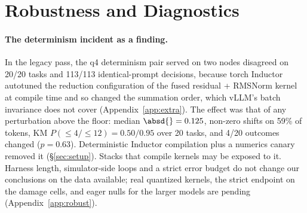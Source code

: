 \section{Robustness and Diagnostics}
\label{sec:diagnostics}

\paragraph{The determinism incident as a finding.} In the legacy pass, the q4 determinism pair served on two nodes disagreed on 20/20 tasks and 113/113 identical-prompt decisions, because torch Inductor autotuned the reduction configuration of the fused residual + RMSNorm kernel at compile time and so changed the summation order, which vLLM's batch invariance does not cover (Appendix~\ref{app:extra}). The effect was that of any perturbation above the floor: median $\absd{} = 0.125$, non-zero shifts on 59\% of tokens, KM $P(\le 4 / \le 12) = 0.50 / 0.95$ over 20 tasks, and 4/20 outcomes changed ($p = 0.63$). Deterministic Inductor compilation plus a numerics canary removed it (\S\ref{sec:setup}). Stacks that compile kernels may be exposed to it. Harness length, simulator-side loops and a strict error budget \citep{jang2026flat} do not change our conclusions on the data available; real quantized kernels, the strict endpoint on the damage cells, and eager nulls for the larger models are pending (Appendix~\ref{app:robust}).
